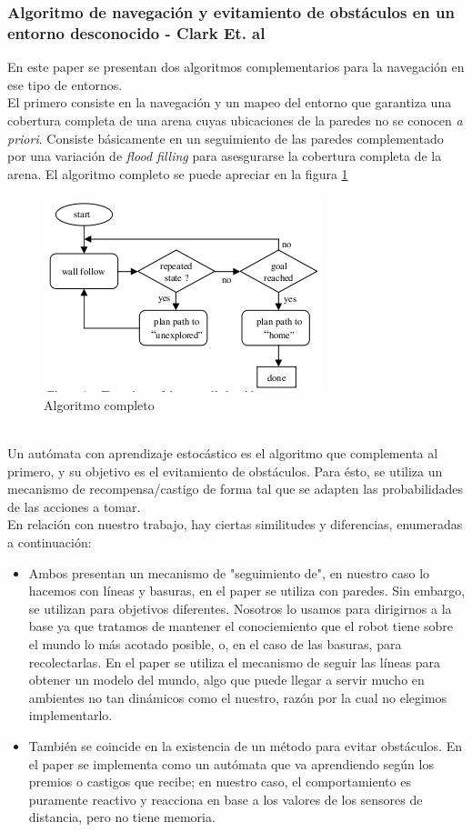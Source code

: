 \subsubsection{Algoritmo de navegaci\'on y evitamiento de obst\'aculos en un entorno desconocido - Clark Et. al \cite{clark}}
En este paper se presentan dos algoritmos complementarios para la navegaci\'on en ese tipo de entornos.
\\
El primero consiste en la navegaci\'on y un mapeo del entorno que garantiza una cobertura completa de una arena
cuyas ubicaciones de la paredes no se conocen \emph{a priori}. Consiste b\'asicamente en un seguimiento de las
paredes complementado por una variaci\'on de \emph{flood filling} para asesgurarse la cobertura completa de la
arena. El algoritmo completo se puede apreciar en la figura \ref{fig:clark}
\begin{figure}[htp]
\begin{center}
\includegraphics[scale=0.8]{comportamientos/clarkDiagram.png}
\caption{Algoritmo completo}
\label{fig:clark}
\end{center}
\end{figure}
\\
Un aut\'omata con aprendizaje estoc\'astico es el algoritmo que complementa al primero, y su objetivo es
el evitamiento de obst\'aculos. Para \'esto, se utiliza un mecanismo de recompensa/castigo de forma tal
que se adapten las probabilidades de las acciones a tomar. 
\\
En relaci\'on con nuestro trabajo, hay ciertas similitudes y diferencias, enumeradas a continuaci\'on:
\begin{itemize}
\item{}Ambos presentan un mecanismo de "seguimiento de", en nuestro caso lo hacemos con l\'ineas y basuras, en
el paper se utiliza con paredes. Sin embargo, se utilizan para objetivos diferentes. Nosotros lo usamos para
dirigirnos a la base ya que tratamos de mantener el conociemiento que el robot tiene sobre el mundo lo m\'as
acotado posible, o, en el caso de las basuras, para recolectarlas. En el paper se utiliza el mecanismo de seguir
las l\'ineas para obtener un modelo del mundo, algo que puede llegar a servir mucho en ambientes no tan din\'amicos
como el nuestro, raz\'on por la cual no elegimos implementarlo.
\item{}Tambi\'en se coincide en la existencia de un m\'etodo para evitar obst\'aculos. En el paper se implementa como
un aut\'omata que va aprendiendo seg\'un los premios o castigos que recibe; en nuestro caso, el comportamiento es puramente
reactivo y reacciona en base a los valores de los sensores de distancia, pero no tiene memoria.
\end{itemize}

